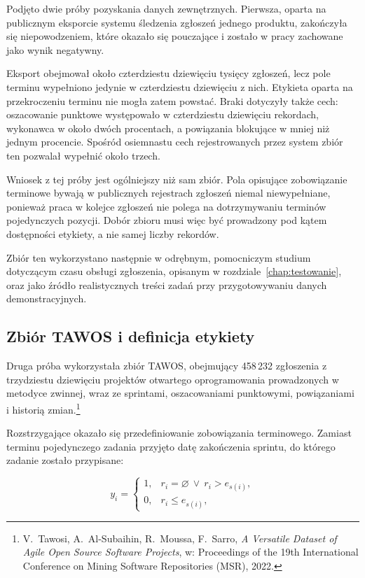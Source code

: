 Podjęto dwie próby pozyskania danych zewnętrznych. Pierwsza, oparta na publicznym eksporcie systemu śledzenia zgłoszeń jednego produktu, zakończyła się niepowodzeniem, które okazało się pouczające i zostało w pracy zachowane jako wynik negatywny.

Eksport obejmował około czterdziestu dziewięciu tysięcy zgłoszeń, lecz pole terminu wypełniono jedynie w czterdziestu dziewięciu z nich. Etykieta oparta na przekroczeniu terminu nie mogła zatem powstać. Braki dotyczyły także cech: oszacowanie punktowe występowało w czterdziestu dziewięciu rekordach, wykonawca w około dwóch procentach, a powiązania blokujące w mniej niż jednym procencie. Spośród osiemnastu cech rejestrowanych przez system zbiór ten pozwalał wypełnić około trzech.

Wniosek z tej próby jest ogólniejszy niż sam zbiór. Pola opisujące zobowiązanie terminowe bywają w publicznych rejestrach zgłoszeń niemal niewypełniane, ponieważ praca w kolejce zgłoszeń nie polega na dotrzymywaniu terminów pojedynczych pozycji. Dobór zbioru musi więc być prowadzony pod kątem dostępności etykiety, a nie samej liczby rekordów.

Zbiór ten wykorzystano następnie w odrębnym, pomocniczym studium dotyczącym czasu obsługi zgłoszenia, opisanym w rozdziale~\ref{chap:testowanie}, oraz jako źródło realistycznych treści zadań przy przygotowywaniu danych demonstracyjnych.

\subsection{Zbiór TAWOS i definicja etykiety}

Druga próba wykorzystała zbiór TAWOS, obejmujący 458\,232 zgłoszenia z trzydziestu dziewięciu projektów otwartego oprogramowania prowadzonych w metodyce zwinnej, wraz ze sprintami, oszacowaniami punktowymi, powiązaniami i historią zmian.\footnote{V.~Tawosi, A.~Al-Subaihin, R.~Moussa, F.~Sarro, \textit{A Versatile Dataset of Agile Open Source Software Projects}, w: Proceedings of the 19th International Conference on Mining Software Repositories (MSR), 2022.}

Rozstrzygające okazało się przedefiniowanie zobowiązania terminowego. Zamiast terminu pojedynczego zadania przyjęto datę zakończenia sprintu, do którego zadanie zostało przypisane:

\begin{equation}
    y_i =
    \begin{cases}
        1, & r_i = \varnothing \ \lor\ r_i > e_{s(i)},\\
        0, & r_i \leq e_{s(i)},
    \end{cases}
    \label{eq:etykieta-tawos}
\end{equation}

